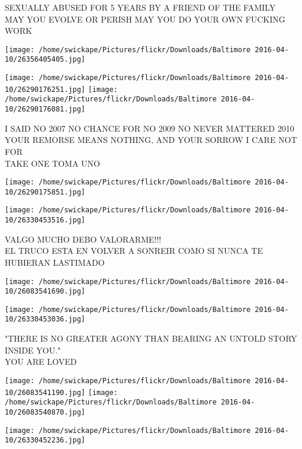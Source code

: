 \documentclass[10pt,letterpaper]{article}
\begin{document}
SEXUALLY ABUSED FOR 5 YEARS BY A FRIEND OF THE FAMILY\\
MAY YOU EVOLVE OR PERISH MAY YOU DO YOUR OWN FUCKING WORK\\
\pagebreak

\texttt{[image: /home/swickape/Pictures/flickr/Downloads/Baltimore 2016-04-10/26356405405.jpg]}

\vspace{0.25in}
\texttt{[image: /home/swickape/Pictures/flickr/Downloads/Baltimore 2016-04-10/26290176251.jpg]}
\texttt{[image: /home/swickape/Pictures/flickr/Downloads/Baltimore 2016-04-10/26290176081.jpg]}

I SAID NO 2007 NO CHANCE FOR NO 2009 NO NEVER MATTERED 2010\\
YOUR REMORSE MEANS NOTHING, AND YOUR SORROW I CARE NOT FOR\\
TAKE ONE TOMA UNO\\
\pagebreak

\texttt{[image: /home/swickape/Pictures/flickr/Downloads/Baltimore 2016-04-10/26290175851.jpg]}

\vspace{0.25in}
\texttt{[image: /home/swickape/Pictures/flickr/Downloads/Baltimore 2016-04-10/26330453516.jpg]}

VALGO MUCHO DEBO VALORARME!!!\\
EL TRUCO ESTA EN VOLVER A SONREIR COMO SI NUNCA TE HUBIERAN LASTIMADO\\
\pagebreak

\texttt{[image: /home/swickape/Pictures/flickr/Downloads/Baltimore 2016-04-10/26083541690.jpg]}

\vspace{0.25in}
\texttt{[image: /home/swickape/Pictures/flickr/Downloads/Baltimore 2016-04-10/26330453036.jpg]}

"THERE IS NO GREATER AGONY THAN BEARING AN UNTOLD STORY INSIDE YOU."\\
YOU ARE LOVED\\
\pagebreak

\texttt{[image: /home/swickape/Pictures/flickr/Downloads/Baltimore 2016-04-10/26083541190.jpg]}
\texttt{[image: /home/swickape/Pictures/flickr/Downloads/Baltimore 2016-04-10/26083540870.jpg]}

\texttt{[image: /home/swickape/Pictures/flickr/Downloads/Baltimore 2016-04-10/26330452236.jpg]}
\end{document}
